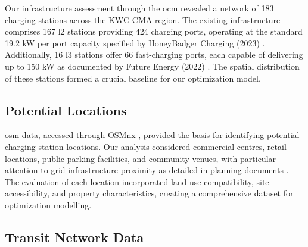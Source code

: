 Our infrastructure assessment through the \gls{ocm} \cite{ocm2024} revealed a network of 183 charging stations across the KWC-CMA region. The existing infrastructure comprises 167 \gls{l2} stations providing 424 charging ports, operating at the standard 19.2 kW per port capacity specified by HoneyBadger Charging (2023) \cite{honey2023}. Additionally, 16 \gls{l3} stations offer 66 fast-charging ports, each capable of delivering up to 150 kW as documented by Future Energy (2022) \cite{future2022}. The spatial distribution of these stations formed a crucial baseline for our optimization model.

\subsection{Potential Locations}


\Gls{osm} data, accessed through OSMnx \cite{boeing2024}, provided the basis for identifying potential charging station locations. Our analysis considered commercial centres, retail locations, public parking facilities, and community venues, with particular attention to grid infrastructure proximity as detailed in  planning documents \cite{ieso2021}. The evaluation of each location incorporated land use compatibility, site accessibility, and property characteristics, creating a comprehensive dataset for optimization modelling.

\subsection{Transit Network Data}


